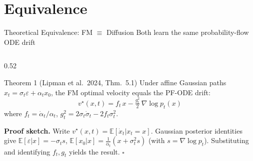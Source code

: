 \documentclass[10pt,aspectratio=169]{beamer}
\newcommand{\E}{\mathbb{E}}
\begin{document}
\section{Equivalence}
\begin{frame}{Theoretical Equivalence: FM $\equiv$ Diffusion}
  {Both learn the same probability-flow ODE drift}

  \begin{columns}[c]
    \begin{column}{0.52\textwidth}
      \begin{block}{Theorem 1 \normalfont\small(Lipman et al.\ 2024, Thm.~5.1)}
        Under affine Gaussian paths $x_t=\sigma_t\varepsilon+\alpha_t x_0$,
        the FM optimal velocity equals the PF-ODE drift:
        \[
          \boxed{v^\star(x,t)=f_t\,x-\tfrac{g_t^2}{2}\,\nabla\!\log p_t(x)}
        \]
        where $f_t=\dot\alpha_t/\alpha_t$,
        $g_t^2=2\sigma_t\dot\sigma_t-2f_t\sigma_t^2$.
      \end{block}

      \vspace{0.4em}
      \small\textbf{Proof sketch.} Write $v^\star(x,t)=\E[\dot x_t|x_t=x]$.
      Gaussian posterior identities give
      $\E[\varepsilon|x]=-\sigma_t s$,
      $\E[x_0|x]=\frac{1}{\alpha_t}(x+\sigma_t^2 s)$
      (with $s=\nabla\log p_t$). Substituting and identifying $f_t,g_t$
      yields the result. $\square$


\end{column}
\end{columns}
\end{frame}
\end{document}
